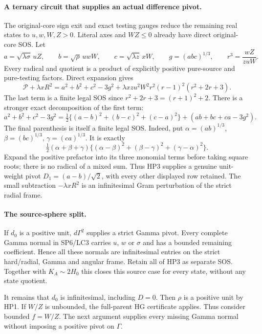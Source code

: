 \paragraph{A ternary circuit that supplies an actual difference pivot.}
The original-core sign exit and exact testing gauges reduce the
remaining real states to $u,w,W,Z>0$.  Literal axes and $WZ\le0$
already have direct original-core SOS.  Let
\[
 a=\sqrt{\lambda\sigma}\,uZ,\qquad
 b=\sqrt\rho\,uwW,\qquad
 c=\sqrt{\lambda z}\,xW,\qquad g=(abc)^{1/3},
 \qquad r^3=\frac{wZ}{zuW}.
\]
Every radical and quotient is a product of explicitly positive
pure-source and pure-testing factors.  Direct expansion gives
\[
 \boxed{\quad
 \mathscr P+\lambda xR^2
 =a^2+b^2+c^2-3g^2
  +\lambda xzu^2W^2 r^2(r-1)^2(r^2+2r+3).
 \quad} \tag{HP3}
\]
The last term is a finite legal SOS since $r^2+2r+3=(r+1)^2+2$.
There is a stronger exact decomposition of the first term:
\[
 a^2+b^2+c^2-3g^2
 =\tfrac12\{(a-b)^2+(b-c)^2+(c-a)^2\}
       +(ab+bc+ca-3g^2).
 \tag{HP4}
\]
The final parenthesis is itself a finite legal SOS.  Indeed, put
$\alpha=(ab)^{1/3}$, $\beta=(bc)^{1/3}$,
$\gamma=(ca)^{1/3}$.  It is exactly
\[
 \tfrac12(\alpha+\beta+\gamma)
    \{(\alpha-\beta)^2+(\beta-\gamma)^2+(\gamma-\alpha)^2\}.
 \tag{HP5}
\]
Expand the positive prefactor into its three monomial terms before
taking square roots; there is no radical of a mixed sum.  Thus HP3
supplies a genuine unit-weight pivot
$D_1=(a-b)/\sqrt2$, with every other displayed row retained.
The small subtraction $-\lambda xR^2$ is an infinitesimal Gram
perturbation of the strict radial frame.

\paragraph{The source-sphere split.}
If $d_0$ is a positive unit, $d\Gamma^2$ supplies a strict Gamma
pivot.  Every complete Gamma normal in SP6/LC3 carries $u$, $w$
or $\sigma$ and has a bounded remaining coefficient.  Hence all
these normals are infinitesimal entries on the strict hard/radial,
Gamma and angular frame.  Retain all of HP3 as separate SOS.
Together with $K_A\sim2H_0$ this closes this source case for every
state, without any state quotient.

It remains that $d_0$ is infinitesimal, including $D=0$.
Then $\rho$ is a positive unit by HP1.  If $W/Z$ is unbounded,
the full-parent HG certificate applies.  Thus consider bounded
$f=W/Z$.  The next argument supplies every missing Gamma normal
without imposing a positive pivot on $\Gamma$.


